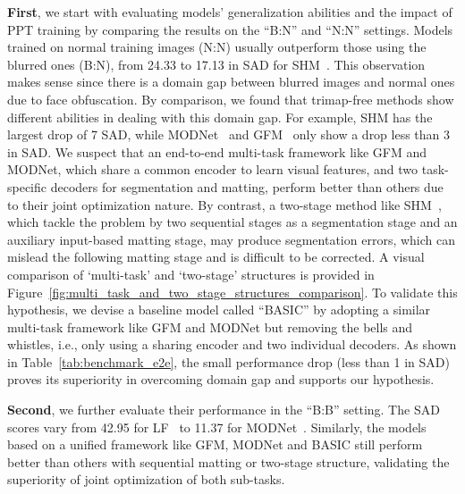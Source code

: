 \documentclass[twocolumn]{svjour3}
\begin{document}
\textbf{First}, we start with evaluating models' generalization abilities and the impact of PPT training by comparing the results on the ``B:N'' and ``N:N'' settings. Models trained on normal training images (N:N) usually outperform those using the blurred ones (B:N), from 24.33 to 17.13 in SAD for SHM~\citep{shm}. This observation makes sense since there is a domain gap between blurred images and normal ones due to face obfuscation. By comparison, we found that trimap-free methods show different abilities in dealing with this domain gap. For example, SHM has the largest drop of 7 SAD, while MODNet~\citep{modnet} and GFM~\citep{gfm} only show a drop less than 3 in SAD. We suspect that an end-to-end multi-task framework like GFM and MODNet, which share a common encoder to learn visual features, and two task-specific decoders for segmentation and matting, perform better than others due to their joint optimization nature. By contrast, a two-stage method like SHM~\citep{shm}, which tackle the problem by two sequential stages as a segmentation stage and an auxiliary input-based matting stage, may produce segmentation errors, which can mislead the following matting stage and is difficult to be corrected. A visual comparison of `multi-task' and `two-stage' structures is provided in Figure~\ref{fig:multi_task_and_two_stage_structures_comparison}. To validate this hypothesis, we devise a baseline model called ``BASIC'' by adopting a similar multi-task framework like GFM and MODNet but removing the bells and whistles, i.e., only using a sharing encoder and two individual decoders. As shown in Table~\ref{tab:benchmark_e2e}, the small performance drop (less than 1 in SAD) proves its superiority in overcoming domain gap and supports our hypothesis.

\begin{figure*}[!t]
\centering
\captionsetup[subfloat]{labelformat=empty,justification=centering}
\caption{Diagram of the model structures of ``multi-task'' methods and ``two-stage'' methods.}
\label{fig:multi_task_and_two_stage_structures_comparison}
\end{figure*}

\textbf{Second}, we further evaluate their performance in the ``B:B'' setting. The SAD scores vary from 42.95 for LF~\citep{lf} to 11.37 for MODNet~\citep{modnet}. Similarly, the models based on a unified framework like GFM, MODNet and BASIC still perform better than others with sequential matting or two-stage structure, validating the superiority of joint optimization of both sub-tasks.
\end{document}

